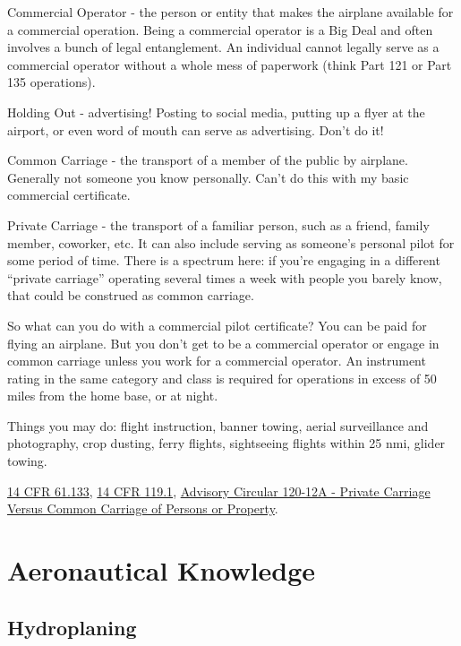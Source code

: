 Commercial Operator - the person or entity that makes the airplane available for a commercial operation. Being a commercial operator is a Big Deal and often involves a bunch of legal entanglement. An individual cannot legally serve as a commercial operator without a whole mess of paperwork (think Part 121 or Part 135 operations).

Holding Out - advertising! Posting to social media, putting up a flyer at the airport, or even word of mouth can serve as advertising. Don't do it!

Common Carriage - the transport of a member of the public by airplane. Generally not someone you know personally. Can't do this with my basic commercial certificate.

Private Carriage - the transport of a familiar person, such as a friend, family member, coworker, etc. It can also include serving as someone's personal pilot for some period of time. There is a spectrum here: if you're engaging in a different ``private carriage'' operating several times a week with people you barely know, that could be construed as common carriage.

So what can you do with a commercial pilot certificate? You can be paid for flying an airplane. But you don't get to be a commercial operator or engage in common carriage unless you work for a commercial operator. An instrument rating in the same category and class is required for operations in excess of 50 miles from the home base, or at night.

Things you may do: flight instruction, banner towing, aerial surveillance and photography, crop dusting, ferry flights, sightseeing flights within 25 nmi, glider towing.

\href{https://www.ecfr.gov/current/title-14/chapter-I/subchapter-D/part-61/subpart-F/section-61.133}{14 CFR 61.133}, \href{https://www.ecfr.gov/current/title-14/chapter-I/subchapter-G/part-119}{14 CFR 119.1}, \href{https://www.faa.gov/regulations_policies/advisory_circulars/index.cfm/go/document.information/documentID/22647}{Advisory Circular 120-12A - Private Carriage Versus Common Carriage of Persons or Property}.

\section{Aeronautical Knowledge}

\subsection{Hydroplaning}


